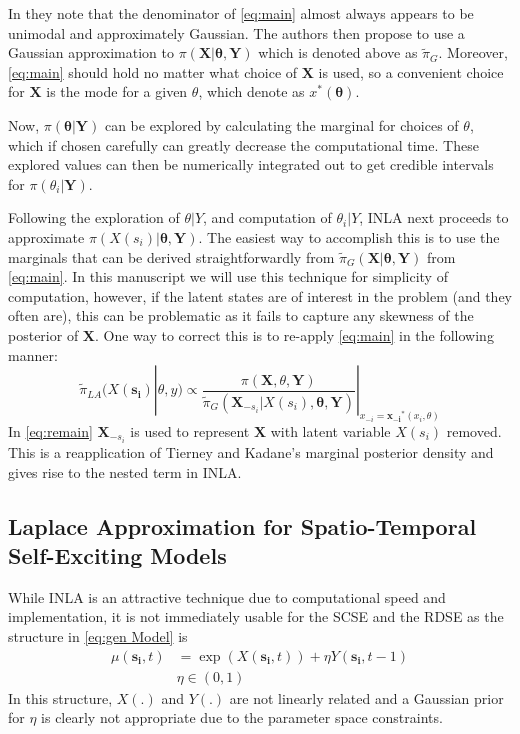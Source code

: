 \documentclass[11pt]{isuthesis}
\begin{document}
In \cite{rue2009approximate} they note that the denominator of \eqref{eq:main} almost always appears to be unimodal and approximately Gaussian.  The authors then propose to use a Gaussian approximation to $\pi(\boldsymbol{X}|\boldsymbol{\theta},\boldsymbol{Y})$ which is denoted above as $\tilde{\pi}_G$.  Moreover, \eqref{eq:main} should hold no matter what choice of $\boldsymbol{X}$ is used, so a convenient choice for $\boldsymbol{X}$ is the mode for a given $\theta$, which \cite{rue2009approximate} denote as $x^*(\boldsymbol{\theta})$.  

Now, $\pi(\boldsymbol{\theta}|\boldsymbol{Y})$ can be explored by calculating the marginal for choices of $\theta$, which if chosen carefully can greatly decrease the computational time.  These explored values can then be numerically integrated out to get credible intervals for $\pi(\theta_i|\boldsymbol{Y})$.

Following the exploration of $\theta|Y$, and computation of $\theta_i|Y$, INLA next proceeds to approximate $\pi(X(s_i)|\boldsymbol{\theta},\boldsymbol{Y})$.  The easiest way to accomplish this is to use the marginals that can be derived straightforwardly from $\tilde{\pi}_G(\boldsymbol{X}|\boldsymbol{\theta},\boldsymbol{Y})$ from \eqref{eq:main}.  In this manuscript we will use this technique for simplicity of computation, however, if the latent states are of interest in the problem (and they often are), this can be problematic as it fails to capture any skewness of the posterior of $\boldsymbol{X}$.  One way to correct this is to re-apply \eqref{eq:main} in the following manner:
\begin{equation}
\tilde{\pi}_{LA}(X(\boldsymbol{s_i})|\theta,y)\propto \frac{\pi(\boldsymbol{X},\theta,\boldsymbol{Y})}{\tilde{\pi}_G(\boldsymbol{X}_{-s_i}|X(s_i),\boldsymbol{\theta},\boldsymbol{Y})}|_{x_{-i}=\boldsymbol{x_{-i}}^*(x_i,\theta)}\label{eq:remain}
\end{equation}
In \eqref{eq:remain} $\boldsymbol{X}_{-s_i}$ is used to represent $\boldsymbol{X}$ with latent variable $X(s_i)$ removed.  This is a reapplication of Tierney and Kadane's marginal posterior density and gives rise to the nested term in INLA. 

\subsection{Laplace Approximation for Spatio-Temporal Self-Exciting Models}
While INLA is an attractive technique due to computational speed and implementation, it is not immediately usable for the SCSE and the RDSE as the structure in \eqref{eq:gen Model} is
\begin{align}
\mu(\boldsymbol{s_i},t) & = \exp(X(\boldsymbol{s_i},t)) + \eta Y(\boldsymbol{s_i},t-1)\nonumber\\
& \eta \in (0,1)
\end{align}
In this structure, $X(.)$ and $Y(.)$ are not linearly related and a Gaussian prior for $\eta$ is clearly not appropriate due to the parameter space constraints.
\end{document}
